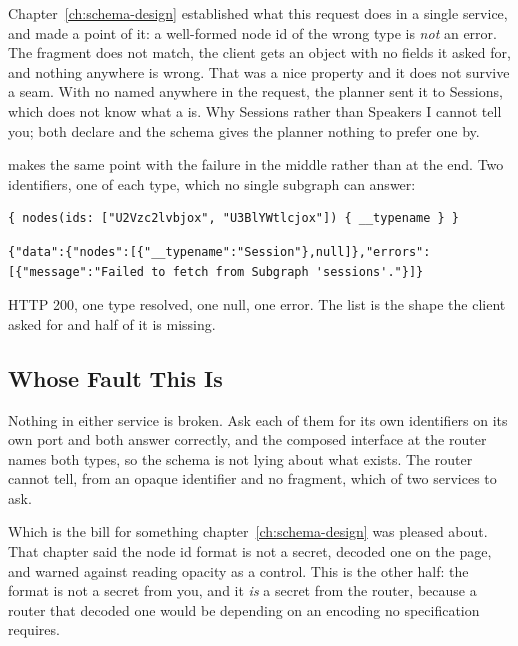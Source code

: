 %
Chapter~\ref{ch:schema-design} established what this request does in a single
service, and made a point of it: a well-formed node id of the wrong type is
\emph{not} an error. The fragment does not match, the client gets an object
with no fields it asked for, and nothing anywhere is wrong. That was a nice
property and it does not survive a seam. With no  named anywhere
in the request, the planner sent it to Sessions, which does not know what a
 is. Why Sessions rather than Speakers I cannot tell you; both
declare  and the schema gives the planner nothing to prefer one
by.

%
 makes the same point with the failure in the middle rather than at
the end. Two identifiers, one of each type, which no single subgraph can
answer:

\begin{verbatim}
{ nodes(ids: ["U2Vzc2lvbjox", "U3BlYWtlcjox"]) { __typename } }
\end{verbatim}

\begin{verbatim}
{"data":{"nodes":[{"__typename":"Session"},null]},"errors":[{"message":"Failed to fetch from Subgraph 'sessions'."}]}
\end{verbatim}

%
HTTP 200, one type resolved, one null, one error. The list is the shape the
client asked for and half of it is missing.

\subsection{Whose Fault This Is}

%
Nothing in either service is broken. Ask each of them for its own
identifiers on its own port and both answer correctly, and the composed
 interface at the router names both types, so the schema is not
lying about what exists. The router cannot tell, from an opaque
identifier and no fragment, which of two services to ask.

%
Which is the bill for something chapter~\ref{ch:schema-design} was pleased
about. That chapter said the node id format is not a secret, decoded one on the
page, and warned against reading opacity as a control. This is the other half:
the format is not a secret from you, and it \emph{is} a secret from the router,
because a router that decoded one would be depending on an encoding no
specification requires.

